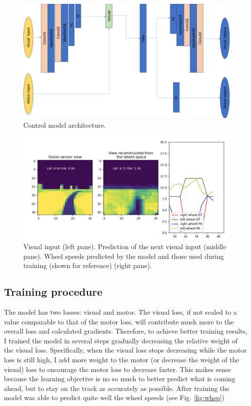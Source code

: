 \documentclass[11pt, oneside]{article}   	%
\begin{document}
\begin{figure}[h]
\includegraphics[width=\columnwidth]{Fig_5} 
\caption{Control model architecture.}
\label{fig:arc}
\end{figure}


\begin{figure}[h]
\includegraphics[width=\columnwidth]{Fig_4} 
\caption{Visual input (left pane). Prediction of the next visual input (middle pane). Wheel speeds predicted by the model and those used during training (shown for reference) (right pane). }
\label{fig:eval}
\end{figure}

\subsection{Training procedure}
The model has two losses: visual and motor. The visual loss, if not scaled to a value comparable to that of the motor loss, will contribute much more to the overall loss and calculated gradients. Therefore, to achi\-eve better training results, I trained the model in several steps gradually decreasing the relative weight of the visual loss. Specifically, when the visual loss stops decreasing while the motor loss is still high, I add more weight to the motor (or decrease the weight of the visual) loss to encourage the motor loss to decrease faster. This makes sense because the learning objective is no so much to better predict what is coming ahead, but to stay on the track as accurately as possible. After training the model was able to predict quite well the wheel speeds (see Fig. \ref{fig:whsp})
\end{document}
